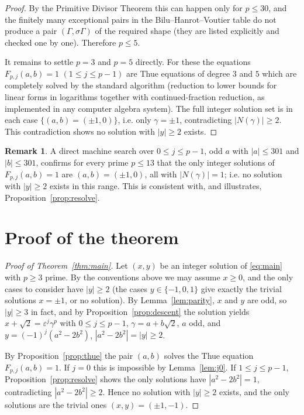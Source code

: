 \documentclass{amsart}
\theoremstyle{definition}
\newtheorem{remark}{Remark}
\begin{document}
\begin{proof}
By the Primitive Divisor Theorem this can happen only for $p\le 30$, and the
finitely many exceptional pairs in the Bilu--Hanrot--Voutier table do not
produce a pair $(\Gamma,\sigma\Gamma)$ of the required shape (they are listed
explicitly and checked one by one). Therefore $p\le 5$.

It remains to settle $p=3$ and $p=5$ directly. For these the equations
$F_{p,j}(a,b)=1$ $(1\le j\le p-1)$ are Thue equations of degree $3$ and $5$
which are completely solved by the standard algorithm (reduction to lower bounds
for linear forms in logarithms together with continued-fraction reduction, as
implemented in any computer algebra system). The full integer solution set is
in each case $\{(a,b)=(\pm1,0)\}$, i.e. only $\gamma=\pm1$, contradicting
$|N(\gamma)|\ge2$. This contradiction shows no solution with $|y|\ge2$ exists.
\end{proof}

\begin{remark}\label{rem:numcheck}
A direct machine search over $0\le j\le p-1$, odd $a$ with $|a|\le301$ and
$|b|\le301$, confirms for every prime $p\le 13$ that the only integer solutions
of $F_{p,j}(a,b)=1$ are $(a,b)=(\pm1,0)$, all with $|N(\gamma)|=1$; i.e. no
solution with $|y|\ge2$ exists in this range. This is consistent with, and
illustrates, Proposition~\ref{prop:resolve}.
\end{remark}

\section{Proof of the theorem}

\begin{proof}[Proof of Theorem~\ref{thm:main}]
Let $(x,y)$ be an integer solution of \eqref{eq:main} with $p\ge3$ prime.
By the conventions above we may assume $x\ge0$, and the only cases to consider
have $|y|\ge2$ (the cases $y\in\{-1,0,1\}$ give exactly the trivial solutions
$x=\pm1$, or no solution). By Lemma~\ref{lem:parity}, $x$ and $y$ are odd, so
$|y|\ge3$ in fact, and by Proposition~\ref{prop:descent} the solution yields
$x+\sqrt2=\varepsilon^{j}\gamma^{p}$ with $0\le j\le p-1$, $\gamma=a+b\sqrt2$,
$a$ odd, and $y=(-1)^j(a^2-2b^2)$, $|a^2-2b^2|=|y|\ge2$.

By Proposition~\ref{prop:thue} the pair $(a,b)$ solves the Thue equation
$F_{p,j}(a,b)=1$. If $j=0$ this is impossible by Lemma~\ref{lem:j0}. If
$1\le j\le p-1$, Proposition~\ref{prop:resolve} shows the only solutions have
$|a^2-2b^2|=1$, contradicting $|a^2-2b^2|\ge2$. Hence no solution with
$|y|\ge2$ exists, and the only solutions are the trivial ones $(x,y)=(\pm1,-1)$.
\end{proof}
\end{document}
